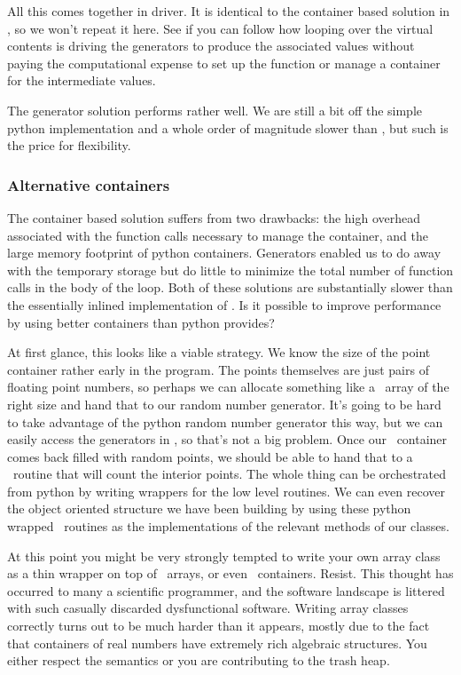 All this comes together in driver. It is identical to the container based solution in
, so we won't repeat it here. See if you can follow how
looping over the virtual contents is driving the generators to produce the associated values
without paying the computational expense to set up the function or manage a container for the
intermediate values.

The generator solution performs rather well. We are still a bit off the simple python
implementation and a whole order of magnitude slower than \cpp, but such is the price for
flexibility. 

\subsubsection{Alternative containers}
\label{sec:classes:alternatives}

The container based solution suffers from two drawbacks: the high overhead associated with the
function calls necessary to manage the container, and the large memory footprint of python
containers. Generators enabled us to do away with the temporary storage but do little to
minimize the total number of function calls in the body of the loop. Both of these solutions
are substantially slower than the essentially inlined implementation of .
Is it possible to improve performance by using better containers than python provides?

At first glance, this looks like a viable strategy. We know the size of the point container
rather early in the program. The points themselves are just pairs of floating point numbers, so
perhaps we can allocate something like a \cc\ array of the right size and hand that to our
random number generator. It's going to be hard to take advantage of the python random number
generator this way, but we can easily access the generators in , so that's not a big
problem. Once our \cc\ container comes back filled with random points, we should be able to
hand that to a \cc\ routine that will count the interior points. The whole thing can be
orchestrated from python by writing wrappers for the low level routines. We can even recover
the object oriented structure we have been building by using these python wrapped \cc\ routines
as the implementations of the relevant methods of our classes. 

At this point you might be very strongly tempted to write your own array class as a thin
wrapper on top of \cc\ arrays, or even \cpp\ containers. Resist. This thought has occurred to
many a scientific programmer, and the software landscape is littered with such casually
discarded dysfunctional software. Writing array classes correctly turns out to be much harder than
it appears, mostly due to the fact that containers of real numbers have extremely rich algebraic
structures. You either respect the semantics or you are contributing to the trash heap.


